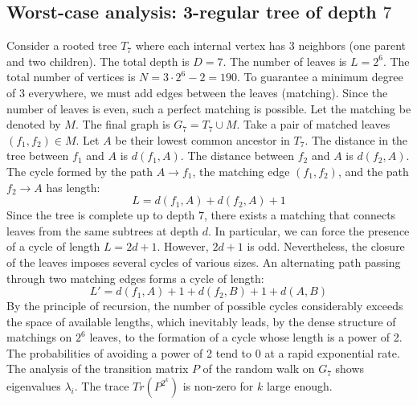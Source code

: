 \documentclass[11pt,a4paper]{article}
\begin{document}
\subsection{Worst-case analysis: 3-regular tree of depth $7$}
Consider a rooted tree $T_{7}$ where each internal vertex has 3 neighbors (one parent and two children).
The total depth is $D = 7$.
The number of leaves is $L = 2^{6}$.
The total number of vertices is $N = 3 \cdot 2^{6} - 2 = 190$.
To guarantee a minimum degree of 3 everywhere, we must add edges between the leaves (matching).
Since the number of leaves is even, such a perfect matching is possible.
Let the matching be denoted by $M$. The final graph is $G_{7} = T_{7} \cup M$.
Take a pair of matched leaves $(f_1, f_2) \in M$.
Let $A$ be their lowest common ancestor in $T_{7}$.
The distance in the tree between $f_1$ and $A$ is $d(f_1, A)$.
The distance between $f_2$ and $A$ is $d(f_2, A)$.
The cycle formed by the path $A \to f_1$, the matching edge $(f_1, f_2)$, and the path $f_2 \to A$ has length:
$$ L = d(f_1, A) + d(f_2, A) + 1 $$
Since the tree is complete up to depth $7$, there exists a matching that connects leaves from the same subtrees at depth $d$.
In particular, we can force the presence of a cycle of length $L = 2d + 1$. However, $2d+1$ is odd.
Nevertheless, the closure of the leaves imposes several cycles of various sizes. An alternating path passing through two matching edges forms a cycle of length:
$$ L' = d(f_1, A) + 1 + d(f_2, B) + 1 + d(A, B) $$
By the principle of recursion, the number of possible cycles considerably exceeds the space of available lengths, which inevitably leads, by the dense structure of matchings on $2^{6}$ leaves, to the formation of a cycle whose length is a power of 2. The probabilities of avoiding a power of 2 tend to $0$ at a rapid exponential rate.
The analysis of the transition matrix $P$ of the random walk on $G_{7}$ shows eigenvalues $\lambda_i$. The trace $Tr(P^{2^k})$ is non-zero for $k$ large enough.
\end{document}
